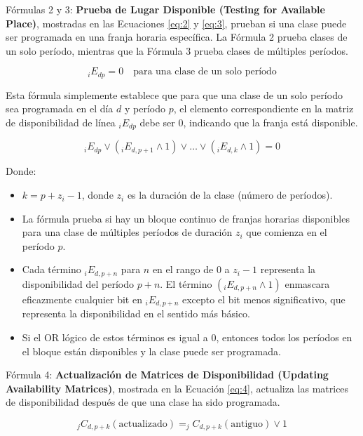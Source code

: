 Fórmulas 2 y 3: \textbf{Prueba de Lugar Disponible (Testing for Available Place)}, mostradas en las Ecuaciones \ref{eq:2} y \ref{eq:3}, prueban si una clase puede ser programada en una franja horaria específica.
La Fórmula 2 prueba clases de un solo período, mientras que la Fórmula 3 prueba clases de múltiples períodos.

\begin{equation}
\label{eq:2}
_iE_{dp} = 0 \quad \text{para una clase de un solo período}
\end{equation}

Esta fórmula simplemente establece que para que una clase de un solo período sea programada en el día \( d \) y período \( p \), el elemento correspondiente en la matriz de disponibilidad de línea \( _iE_{dp} \) debe ser 0, indicando que la franja está disponible.

\begin{equation}
\label{eq:3}
_iE_{dp} \vee (_iE_{d,p+1} \wedge 1) \vee \dots \vee (_iE_{d,k} \wedge 1) = 0
\end{equation}

Donde:
\begin{itemize}
    \item \( k = p + z_i - 1 \), donde \( z_i \) es la duración de la clase (número de períodos).
    \item La fórmula prueba si hay un bloque continuo de franjas horarias disponibles para una clase de múltiples períodos de duración \( z_i \) que comienza en el período \( p \).
    \item Cada término \( _iE_{d,p+n} \) para \( n \) en el rango de \( 0 \) a \( z_i-1 \) representa la disponibilidad del período \( p+n \). El término \( (_iE_{d,p+n} \wedge 1) \) enmascara eficazmente cualquier bit en \( _iE_{d,p+n} \) excepto el bit menos significativo, que representa la disponibilidad en el sentido más básico.
    \item Si el OR lógico de estos términos es igual a 0, entonces todos los períodos en el bloque están disponibles y la clase puede ser programada.
\end{itemize}

Fórmula 4: \textbf{Actualización de Matrices de Disponibilidad (Updating Availability Matrices)}, mostrada en la Ecuación \ref{eq:4}, actualiza las matrices de disponibilidad después de que una clase ha sido programada.

\begin{equation}
\label{eq:4}
_jC_{d, p+k} (\text{actualizado}) = _jC_{d, p+k} (\text{antiguo}) \vee 1
\end{equation}


